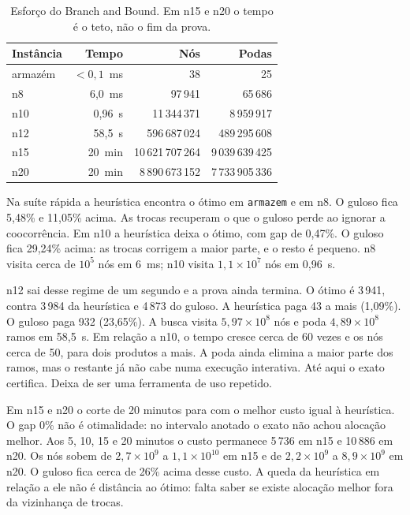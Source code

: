 \documentclass[conference,a4paper]{IEEEtran}
\begin{document}
\begin{table}[H]
\caption{Esforço do Branch and Bound.
Em n15 e n20 o tempo é o teto, não o fim da prova.}
\label{tab:esforco}
\centering
\begin{tabular}{|l|r|r|r|}
\hline
Instância & Tempo & Nós & Podas \\
\hline
armazém & $<0{,}1$~ms & 38 & 25 \\
n8 & 6,0~ms & 97\,941 & 65\,686 \\
n10 & 0,96~s & 11\,344\,371 & 8\,959\,917 \\
n12 & 58,5~s & 596\,687\,024 & 489\,295\,608 \\
n15 & 20~min & 10\,621\,707\,264 & 9\,039\,639\,425 \\
n20 & 20~min & 8\,890\,673\,152 & 7\,733\,905\,336 \\
\hline
\end{tabular}
\end{table}

Na suíte rápida a heurística encontra o ótimo em \texttt{armazem} e em n8.
O guloso fica 5,48\% e 11,05\% acima.
As trocas recuperam o que o guloso perde ao ignorar a coocorrência.
Em n10 a heurística deixa o ótimo, com gap de 0,47\%.
O guloso fica 29,24\% acima: as trocas corrigem a maior parte, e o resto é pequeno.
n8 visita cerca de \(10^{5}\) nós em 6~ms; n10 visita \(1{,}1 \times 10^{7}\) nós em 0,96~s.

n12 sai desse regime de um segundo e a prova ainda termina.
O ótimo é 3\,941, contra 3\,984 da heurística e 4\,873 do guloso.
A heurística paga 43 a mais (1,09\%).
O guloso paga 932 (23,65\%).
A busca visita \(5{,}97 \times 10^{8}\) nós e poda \(4{,}89 \times 10^{8}\) ramos em 58,5~s.
Em relação a n10, o tempo cresce cerca de 60 vezes e os nós cerca de 50, para dois produtos a mais.
A poda ainda elimina a maior parte dos ramos, mas o restante já não cabe numa execução interativa.
Até aqui o exato certifica.
Deixa de ser uma ferramenta de uso repetido.

Em n15 e n20 o corte de 20 minutos para com o melhor custo igual à heurística.
O gap 0\% não é otimalidade: no intervalo anotado o exato não achou alocação melhor.
Aos 5, 10, 15 e 20 minutos o custo permanece 5\,736 em n15 e 10\,886 em n20.
Os nós sobem de \(2{,}7 \times 10^{9}\) a \(1{,}1 \times 10^{10}\) em n15 e de \(2{,}2 \times 10^{9}\) a \(8{,}9 \times 10^{9}\) em n20.
O guloso fica cerca de 26\% acima desse custo.
A queda da heurística em relação a ele não é distância ao ótimo: falta saber se existe alocação melhor fora da vizinhança de trocas.
\end{document}
